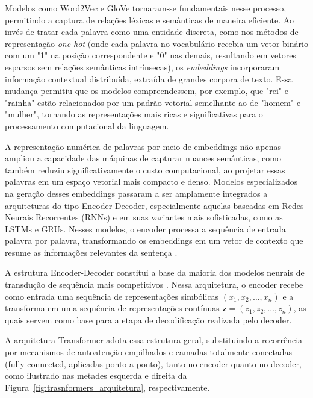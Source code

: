 Modelos como Word2Vec \cite{mikolov_distributed_2013} e GloVe \cite{pennington_glove:_2014} tornaram-se fundamentais nesse processo, permitindo a captura de relações léxicas e semânticas de maneira eficiente. Ao invés de tratar cada palavra como uma entidade discreta, como nos métodos de representação \textit{one-hot} (onde cada palavra no vocabulário recebia um vetor binário com um "1" na posição correspondente e "0" nas demais, resultando em vetores esparsos sem relações semânticas intrínsecas), os \textit{embeddings} incorporaram informação contextual distribuída, extraída de grandes corpora de texto. Essa mudança permitiu que os modelos compreendessem, por exemplo, que "rei" e "rainha" estão relacionados por um padrão vetorial semelhante ao de "homem" e "mulher", tornando as representações mais ricas e significativas para o processamento computacional da linguagem.

A representação numérica de palavras por meio de embeddings não apenas ampliou a capacidade das máquinas de capturar nuances semânticas, como também reduziu significativamente o custo computacional, ao projetar essas palavras em um espaço vetorial mais compacto e denso. Modelos especializados na geração desses embeddings passaram a ser amplamente integrados a arquiteturas do tipo Encoder-Decoder, especialmente aquelas baseadas em Redes Neurais Recorrentes (RNNs) e em suas variantes mais sofisticadas, como as LSTMs e GRUs. Nesses modelos, o encoder processa a sequência de entrada palavra por palavra, transformando os embeddings em um vetor de contexto que resume as informações relevantes da sentença \cite{fu_decoder-only_2023}.

A estrutura Encoder-Decoder constitui a base da maioria dos modelos neurais de transdução de sequência mais competitivos \cite{vaswani_attention_2017}. Nessa arquitetura, o encoder recebe como entrada uma sequência de representações simbólicas
$(x_1, x_2, \ldots, x_n)$
e a transforma em uma sequência de representações contínuas
$\mathbf{z} = (z_1, z_2, \ldots, z_n)$,
as quais servem como base para a etapa de decodificação realizada pelo decoder.

A arquitetura Transformer adota essa estrutura geral, substituindo a recorrência por mecanismos de autoatenção empilhados e camadas totalmente conectadas (fully connected, aplicadas ponto a ponto), tanto no encoder quanto no decoder, como ilustrado nas metades esquerda e direita da Figura~\ref{fig:trasnformers_arquitetura}, respectivamente.

